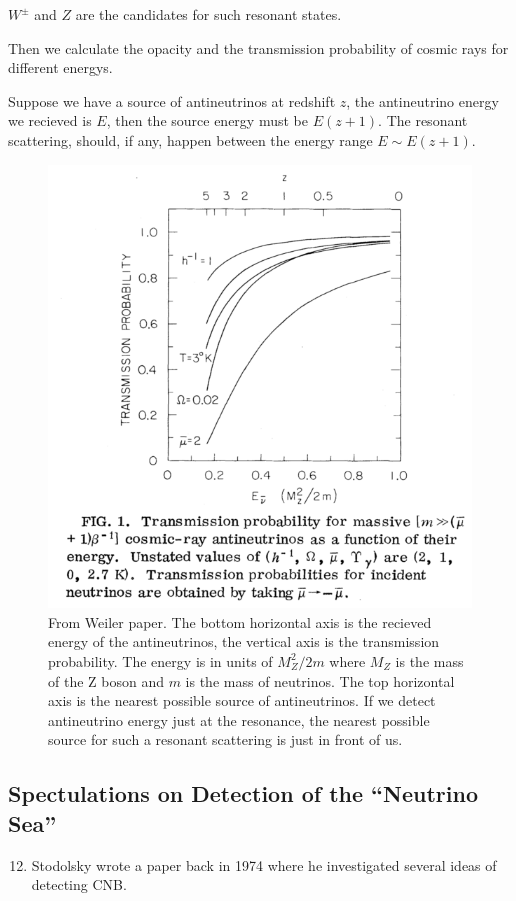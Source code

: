 \documentclass[letterpaper,12pt,english]{sphinxmanual}
\begin{document}
\(W^{\pm}\) and \(Z\) are the candidates for such resonant states.

Then we calculate the opacity and the transmission probability of cosmic rays for different energys.

Suppose we have a source of antineutrinos at redshift \(z\), the antineutrino energy we recieved is \(E\), then the source energy must be \(E(z+1)\). The resonant scattering, should, if any, happen between the energy range \(E\sim E(z+1)\).
\begin{figure}[htbp]
\centering
\capstart

\includegraphics{weiler-resonat-absorption-of-cosmic-rays-cnb.png}
\caption{From Weiler paper. The bottom horizontal axis is the recieved energy of the antineutrinos, the vertical axis is the transmission probability. The energy is in units of \(M_Z^2/2m\) where \(M_Z\) is the mass of the Z boson and \(m\) is the mass of neutrinos. The top horizontal axis is the nearest possible source of antineutrinos. If we detect antineutrino energy just at the resonance, the nearest possible source for such a resonant scattering is just in front of us.}\end{figure}


\subsection{Spectulations on Detection of the ``Neutrino Sea''}
\label{cosmology:spectulations-on-detection-of-the-neutrino-sea}\begin{enumerate}
\setcounter{enumi}{11}
\item {} 
Stodolsky wrote a paper back in 1974 where he investigated several ideas of detecting CNB.

\end{enumerate}
\end{document}
